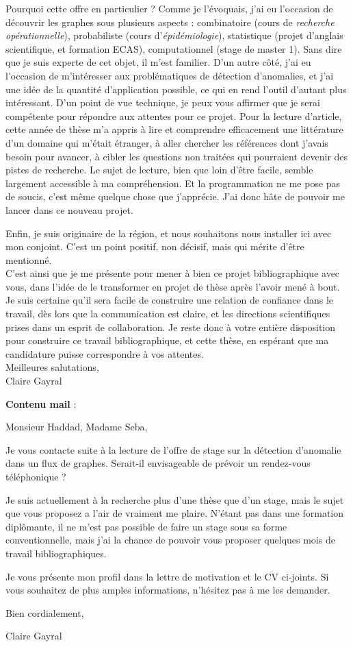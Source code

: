 \documentclass[a4paper,12pt]{article}
\begin{document}
Pourquoi cette offre en particulier ? Comme je l'évoquais, j'ai eu l'occasion de découvrir les graphes sous plusieurs aspects : combinatoire (cours de \textit{recherche opérationnelle}), probabiliste (cours d'\textit{épidémiologie}), statistique (projet d'anglais scientifique, et formation ECAS), computationnel (stage de master 1). Sans dire que je suis experte de cet objet, il m'est familier. D'un autre côté, j'ai eu l'occasion de m'intéresser aux problématiques de détection d'anomalies, et j'ai une idée de la quantité d'application possible, ce qui en rend l'outil d'autant plus intéressant. 
D'un point de vue technique, je peux vous affirmer que je serai compétente pour répondre aux attentes pour ce projet. Pour la lecture d'article, cette année de thèse m'a appris à lire et comprendre efficacement une littérature d'un domaine qui m'était étranger, à aller chercher les références dont j'avais besoin pour avancer, à cibler les questions non traitées qui pourraient devenir des pistes de recherche. Le sujet de lecture, bien que loin d'être facile, semble largement accessible à ma compréhension. Et la programmation ne me pose pas de soucis, c'est même quelque chose que j'apprécie. J'ai donc hâte de pouvoir me lancer dans ce nouveau projet.

Enfin, je suis originaire de la région, et nous souhaitons nous installer ici avec mon conjoint. C'est un point positif, non décisif, mais qui mérite d'être mentionné. 
\\
%

C'est ainsi que je me présente pour mener à bien ce projet bibliographique avec vous, dans l'idée de le transformer en projet de thèse après l'avoir mené à bout. Je suis certaine qu'il sera facile de construire une relation de confiance dans le travail, dès lors que la communication est claire, et les directions scientifiques prises dans un esprit de collaboration. Je reste donc à votre entière disposition pour construire ce travail bibliographique, et cette thèse, en espérant que ma candidature puisse correspondre à vos attentes. \\

Meilleures salutations, \\

Claire Gayral

\vspace{2cm}
\textbf{Contenu mail} : 


Monsieur Haddad, Madame Seba,

Je vous contacte suite à la lecture de l'offre de stage sur la détection d'anomalie dans un flux de graphes. Serait-il  envisageable de prévoir un rendez-vous téléphonique ? 

Je suis actuellement à la recherche plus d'une thèse que d'un stage, mais le sujet que vous proposez a l'air de vraiment me plaire. N'étant pas dans une formation diplômante, il ne m'est pas possible de faire un stage sous sa forme conventionnelle, mais j'ai la chance de pouvoir vous proposer quelques mois de travail bibliographiques. 

Je vous présente mon profil dans la lettre de motivation et le CV ci-joints. Si vous souhaitez de plus amples informations, n'hésitez pas à me les demander.  

Bien cordialement, 

Claire Gayral
\end{document}
